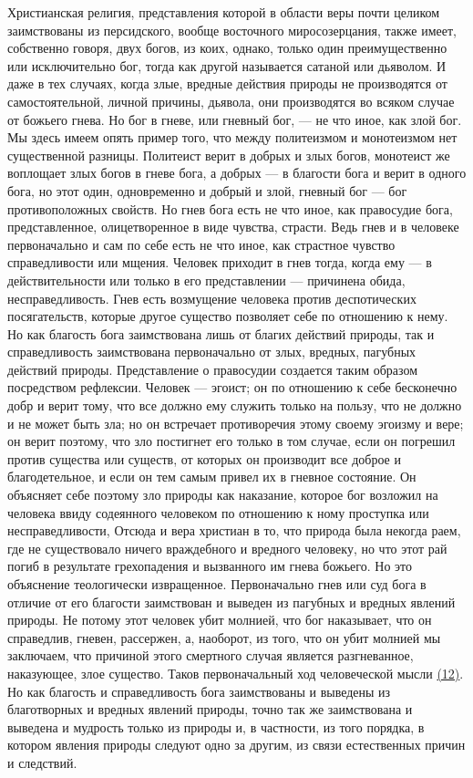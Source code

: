 \documentclass[12pt]{article}
\begin{document}
Христианская религия, представления которой в области веры почти целиком заимствованы из персидского, вообще восточного миросозерцания, также имеет, собственно говоря, двух богов, из коих, однако, только один преимущественно или исключительно бог, тогда как другой называется сатаной или дьяволом. И даже в тех случаях, когда злые, вредные действия природы не производятся от самостоятельной, личной причины, дьявола, они производятся во всяком случае от божьего гнева. Но бог в гневе, или гневный бог, --- не что иное, как злой бог. Мы здесь имеем опять пример того, что между политеизмом и монотеизмом нет существенной разницы. Политеист верит в добрых и злых богов, монотеист же воплощает злых богов в гневе бога, а добрых --- в благости бога и верит в одного бога, но этот один, одновременно и добрый и злой, гневный бог --- бог противоположных свойств. Но гнев бога есть не что иное, как правосудие бога, представленное, олицетворенное в виде чувства, страсти. Ведь гнев и в человеке первоначально и сам по себе есть не что иное, как страстное чувство справедливости или мщения. Человек приходит в гнев тогда, когда ему --- в действительности или только в его представлении --- причинена обида, несправедливость. Гнев есть возмущение человека против деспотических посягательств, которые другое существо позволяет себе по отношению к нему. Но как благость бога заимствована лишь от благих действий природы, так и справедливость заимствована первоначально от злых, вредных, пагубных действий природы. Представление о правосудии создается таким образом посредством рефлексии. Человек --- эгоист; он по отношению к себе бесконечно добр и верит тому, что все должно ему служить только на пользу, что не должно и не может быть зла; но он встречает противоречия этому своему эгоизму и вере; он верит поэтому, что зло постигнет его только в том случае, если он погрешил против существа или существ, от которых он производит все доброе и благодетельное, и если он тем самым привел их в гневное состояние. Он объясняет себе поэтому зло природы как наказание, которое бог возложил на человека ввиду содеянного человеком по отношению к ному проступка или несправедливости, Отсюда и вера христиан в то, что природа была некогда раем, где не существовало ничего враждебного и вредного человеку, но что этот рай погиб в результате грехопадения и вызванного им гнева божьего. Но это объяснение теологически извращенное. Первоначально гнев или суд бога в отличие от его благости заимствован и выведен из пагубных и вредных явлений природы. Не потому этот человек убит молнией, что бог наказывает, что он справедлив, гневен, рассержен, а, наоборот, из того, что он убит молнией мы заключаем, что причиной этого смертного случая является разгневанное, наказующее, злое существо. Таков первоначальный ход человеческой мысли \hyperlink{12}{(12)}\hypertarget{b12}{}. Но как благость и справедливость бога заимствованы и выведены из благотворных и вредных явлений природы, точно так же заимствована и выведена и мудрость только из природы и, в частности, из того порядка, в котором явления природы следуют одно за другим, из связи естественных причин и следствий. 
\end{document}
